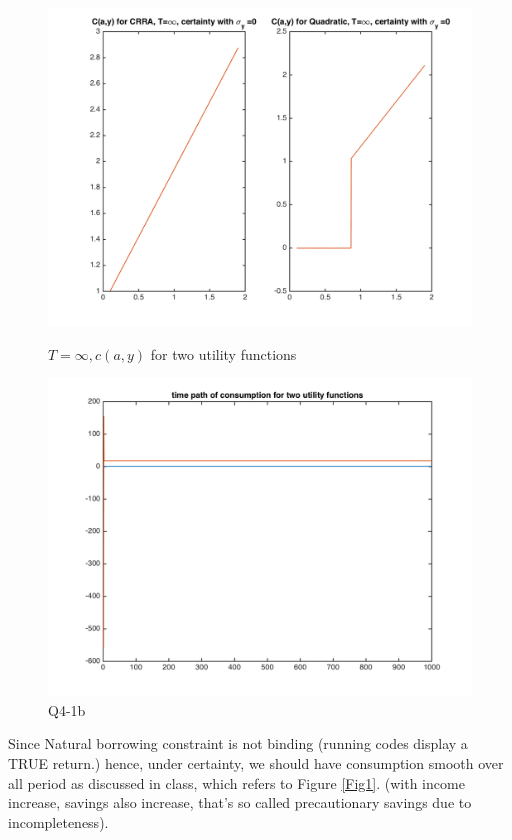 \documentclass{article}[a4paper]
\begin{document}
\begin{figure}[htbp]
\centering
\begin{minipage}[t]{0.48\textwidth}
\includegraphics[width=\textwidth]{img/41a.png}
\caption{$T=\infty, c(a,y)$ for two utility functions}\label{Fig1}
\end{minipage}
\begin{minipage}[t]{0.48\textwidth}
\centering
\includegraphics[width=\textwidth]{img/41aa.png}
\caption{Q4-1b}\label{Fig2}
\end{minipage}
\end{figure}


Since Natural borrowing constraint is not binding (running codes display a TRUE return.) hence, under certainty, we should have consumption smooth over all period as discussed in class, which refers to Figure \ref{Fig1}. (with income increase, savings also increase, that's so called precautionary savings due to incompleteness). 
\end{document}
